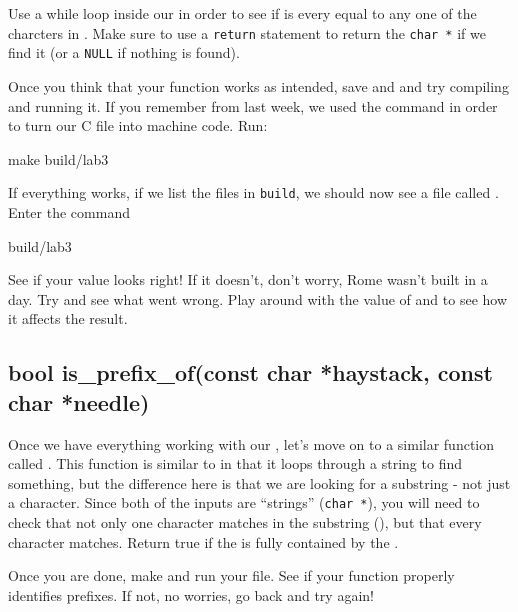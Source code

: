 \documentclass{tufte-handout}
\begin{document}
Use a while loop inside our  in order to see if
 is every equal to any one of the charcters in
.
Make sure to use a \texttt{return} statement to return the
\texttt{char *} if we find it (or a \texttt{NULL} if nothing is found).

Once you think that your function works as intended, save and and try
compiling and running it. If you
remember from last week, we used the  command in
order to turn our C file into machine code. Run:
\begin{CmdLine}
  \prompt make build/lab3
\end{CmdLine}
If everything works, if we list the files in \texttt{build}, we should now see a file called .  Enter the command
\begin{CmdLine}
  \prompt build/lab3
\end{CmdLine}
See if your value looks right!  If it doesn't, don't worry, Rome wasn't built in a day. Try and see what went wrong.  Play around with the value of  and  to see how it affects the result.

\subsection{{bool is\_prefix\_of(const char *haystack,
      const char *needle)}}

Once we have everything working with our , let's
move on to a similar function called
. This
function is similar to  in that it loops through
a string to find something, but the difference here is that we are
looking for a substring - not just a character. Since both of the inputs
are ``strings'' (\texttt{char *}), you will need to check that not only one character matches in the substring (), but that every character matches. Return true if the  is fully contained by the .

Once you are done, make and run your file. See if your function properly identifies prefixes. If not, no worries, go back and try again!
\end{document}
